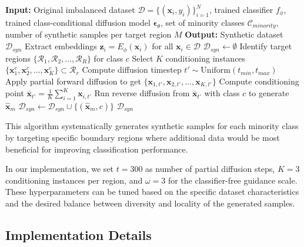 \documentclass{article}
\begin{document}
\begin{algorithm}
\caption{Guided Synthetic Time Series Generation}\label{alg:architecture}
\begin{algorithmic}[1]
\Statex \textbf{Input:} Original imbalanced dataset $\mathcal{D} = \{(\mathbf{x}_i, y_i)\}_{i=1}^N$, trained classifier $f_\phi$, trained class-conditional diffusion model $\boldsymbol{\epsilon}_\theta$, set of minority classes $\mathcal{C}_{minority}$, number of synthetic samples per target region $M$
\Statex \textbf{Output:} Synthetic dataset $\mathcal{D}_{syn}$
\State Extract embeddings $\mathbf{z}_i = E_\phi(\mathbf{x}_i)$ for all $\mathbf{x}_i \in \mathcal{D}$
\State $\mathcal{D}_{syn} \leftarrow \emptyset$
    \State Identify target regions $\{\mathcal{R}_1, \mathcal{R}_2, \ldots, \mathcal{R}_R\}$ for class $c$
        \State Select $K$ conditioning instances $\{\mathbf{x}_1^c, \mathbf{x}_2^c, \ldots, \mathbf{x}_K^c\} \subset \mathcal{R}_r$
            \State Compute diffusion timestep $t' \sim \text{Uniform}(t_{min}, t_{max})$
            \State Apply partial forward diffusion to get $\{\mathbf{x}_{1,t'}, \mathbf{x}_{2,t'}, \ldots, \mathbf{x}_{K,t'}\}$
            \State Compute conditioning point $\bar{\mathbf{x}}_{t'} = \frac{1}{K} \sum_{i=1}^K \mathbf{x}_{i,t'}$
            \State Run reverse diffusion from $\bar{\mathbf{x}}_{t'}$ with class $c$ to generate $\hat{\mathbf{x}}_m$
            \State $\mathcal{D}_{syn} \leftarrow \mathcal{D}_{syn} \cup \{(\hat{\mathbf{x}}_m, c)\}$
        \EndFor
    \EndFor
\EndFor
\State \Return $\mathcal{D}_{syn}$
\end{algorithmic}
\end{algorithm}

This algorithm systematically generates synthetic samples for each minority class by targeting specific boundary regions where additional data would be most beneficial for improving classification performance.

In our implementation, we set $t=300$ as number of partial diffusion steps, $K=3$ conditioning instances per region, and $\omega=3$ for the classifier-free guidance scale. These hyperparameters can be tuned based on the specific dataset characteristics and the desired balance between diversity and locality of the generated samples.

\subsection{Implementation Details}
\end{document}

